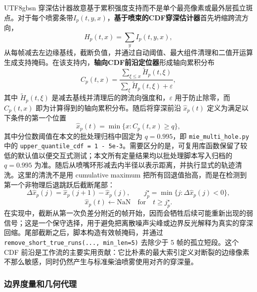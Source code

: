 \documentclass[english, 12pt, a4paper, elec, utf8, a-2b, online]{aaltothesis}
\DeclareRobustCommand{\codepath}[1]{\nolinkurl{#1}}
\begin{document}
\begin{CJK*}{UTF8}{gbsn}
穿深估计器故意基于累积强度支持而不是单个最亮像素或最外层孤立斑点。对于每个喷雾条带\(I_p(t,y,x)\)，\textbf{基于喷束的CDF穿深估计器}首先坍缩跨流方向，
\[
H_p(t,x)=\sum_y I_p(t,y,x),
\]
从每帧减去左边缘基线，截断负值，并通过自动阈值、最大组件清理和二值开运算生成支持掩码。在该支持内，\textbf{轴向CDF前沿定位器}形成轴向累积分布
\[
C_p(t,x)=\frac{\sum_{\xi \le x} \tilde{H}_p(t,\xi)}{\sum_{\xi} \tilde{H}_p(t,\xi)+\varepsilon},
\]
其中 \(\tilde{H}_p(t,\xi)\) 是减去基线并清理后的跨流向强度和，\(\varepsilon\) 用于防止除零，而 \(C_p(t,x)\) 即为计算得到的轴向累积分布。随后将穿深前沿 \(\hat{x}_p(t)\) 定义为满足以下条件的第一个位置
\[
\hat{x}_p(t)=\min \{x : C_p(t,x)\ge q\},
\]
其中分位数阈值在本文的批处理归档中固定为 \(q=0.995\)，即 \codepath{mie\_multi\_hole.py} 中的 \texttt{upper\_quantile\_cdf = 1 - 5e-3}。需要区分的是，可复用库函数保留了较低的默认值以便交互式测试；本文所有定量结果均以批处理脚本写入归档的 \(q=0.995\) 为准。随后从喷嘴环形减去内半径以表示距离，并执行显式的轨迹清洗。这里的清洗不是用 cumulative maximum 把所有回退值抬高，而是在检测到第一个非物理后退跳跃后截断尾部：
\[
\Delta \hat{x}_p(j)=\hat{x}_p(j+1)-\hat{x}_p(j),\qquad
j_p^\star=\min\{j:\Delta \hat{x}_p(j)<0\},
\]
\[
\hat{x}_p(t)\leftarrow \mathrm{NaN}\quad \text{for}\quad t\ge j_p^\star .
\]
在实现中，截断从第一次负差分附近的帧开始，因而会牺牲后续可能重新出现的弱信号；这是一个保守选择，用于避免把离散噪声尖峰或边界反光解释为真实的穿深回缩。尾部截断之后，脚本构造有效帧掩码，并通过 \texttt{remove\_short\_true\_runs(..., min\_len=5)} 去除少于 5 帧的孤立短段。这个 CDF 前沿是工作流的主要实用贡献：它比朴素的最大索引定义对断裂的边缘像素不那么敏感，同时仍然产生与标准柴油喷雾使用对齐的穿深量\cite{Dent1971Penetration,HiroyasuArai1990,NaberSiebers1996}。

\subsubsection{边界度量和几何代理}


\end{CJK*}
\end{document}
